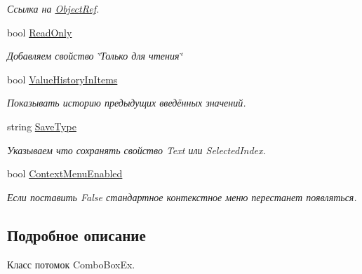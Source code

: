 \begin{DoxyCompactItemize}
\begin{DoxyCompactList}\small\item\em Ссылка на \mbox{\hyperlink{class_f_b_a_1_1_object_ref}{Object\+Ref}}. \end{DoxyCompactList}\item 
bool \mbox{\hyperlink{class_f_b_a_1_1_combo_box_f_b_a_a75d2e745573785f3419bb85145d339ff}{Read\+Only}}
\begin{DoxyCompactList}\small\item\em Добавляем свойство \char`\"{}Только для чтения\char`\"{} \end{DoxyCompactList}\item 
bool \mbox{\hyperlink{class_f_b_a_1_1_combo_box_f_b_a_a1152b8807c76816244c86a6ea3c63855}{Value\+History\+In\+Items}}
\begin{DoxyCompactList}\small\item\em Показывать историю предыдущих введённых значений. \end{DoxyCompactList}\item 
string \mbox{\hyperlink{class_f_b_a_1_1_combo_box_f_b_a_a21f4edb61f850586f228b7b91cdb3147}{Save\+Type}}
\begin{DoxyCompactList}\small\item\em Указываем что сохранять свойство Text или Selected\+Index. ~\newline
\end{DoxyCompactList}\item 
bool \mbox{\hyperlink{class_f_b_a_1_1_combo_box_f_b_a_acdee2a6842764056b6c6990d68a040cd}{Context\+Menu\+Enabled}}
\begin{DoxyCompactList}\small\item\em Если поставить False стандартное контекстное меню перестанет появляться. \end{DoxyCompactList}\end{DoxyCompactItemize}


\subsection{Подробное описание}
Класс потомок Combo\+Box\+Ex. 



